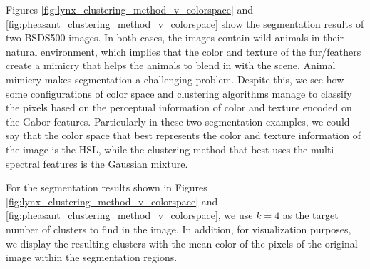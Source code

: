 \documentclass[journal]{IEEEtran}
\begin{document}
Figures \ref{fig:lynx_clustering_method_v_colorspace} and \ref{fig:pheasant_clustering_method_v_colorspace} show the segmentation results of two BSDS500 images. In both cases, the images contain wild animals in their natural environment, which implies that the color and texture of the fur/feathers create a mimicry that helps the animals to blend in with the scene. Animal mimicry makes segmentation a challenging problem. Despite this, we see how some configurations of color space and clustering algorithms manage to classify the pixels based on the perceptual information of color and texture encoded on the Gabor features. Particularly in these two segmentation examples, we could say that the color space that best represents the color and texture information of the image is the HSL, while the clustering method that best uses the multi-spectral features is the Gaussian mixture. 

For the segmentation results shown in Figures \ref{fig:lynx_clustering_method_v_colorspace} and \ref{fig:pheasant_clustering_method_v_colorspace}, we use $k = 4$ as the target number of clusters to find in the image. In addition, for visualization purposes, we display the resulting clusters with the mean color of the pixels of the original image within the segmentation regions. 
\end{document}
